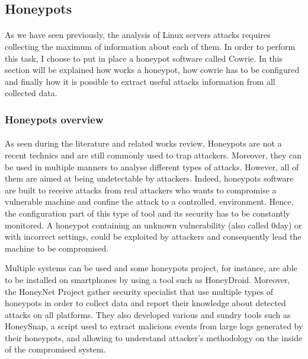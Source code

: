 \subsection{Honeypots}

\paragraph{} %

As we have seen previously, the analysis of Linux servers attacks requires collecting the 
maximum of information about each of them. In order to perform this task, I choose to put 
in place a honeypot software called Cowrie.
In this section will be explained how works a honeypot, how cowrie has to be configured and
finally how it is possible to extract useful attacks information from all collected data.

\subsubsection{Honeypots overview} %

\paragraph{}  

As seen during the literature and related works review, Honeypots are not a recent technics
and are still commonly used to trap attackers. Moreover, they can be used in multiple manners
to analyse different types of attacks. However, all of them are aimed at being undetectable 
by attackers. Indeed, honeypots software are built to receive attacks from real attackers
who wants to compromise a vulnerable machine and confine the attack to a controlled. 
environment. Hence, the configuration part of this type of tool and its security has to be
constantly monitored. A honeypot containing an unknown vulnerability (also called 0day) or
with incorrect settings, could be exploited by attackers and consequently lead
the machine to be compromised. 

Multiple systems can be used and some honeypots project, for instance, are able to be
installed on smartphones by using a tool such as HoneyDroid. Moreover, the HoneyNet Project 
gather security specialist that use multiple types of honeypots in order to collect data 
and report their knowledge about detected attacks on all platforms. They also developed 
various and sundry tools such as HoneySnap, a script used to extract malicious events from 
large logs generated by their honeypots, and allowing to understand attacker's methodology 
on the inside of the compromised system.

